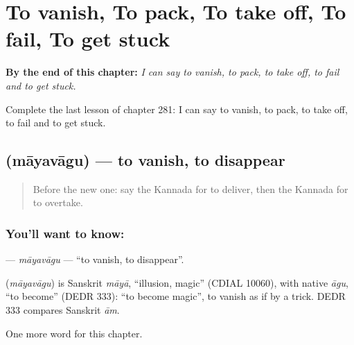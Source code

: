
\chapter{To vanish, To pack, To take off, To fail, To get stuck}
\label{ch:ka-to-vanish-to-pack-to-take-off-to-fail-to-get-stuck}

\begin{chapteropening}
\textbf{By the end of this chapter:} \emph{I can say to vanish, to pack, to take off, to fail and to get stuck.}

Complete the last lesson of chapter 281: I can say to vanish, to pack, to take off, to fail and to get stuck.
\end{chapteropening}

\section[\texorpdfstring{\kn{ಮಾಯವಾಗು} (māyavāgu)}{ಮಾಯವಾಗು (māyavāgu)}]{ (māyavāgu) — to vanish, to disappear}

\label{lesson:KA-C281-mayavagu}



\begin{quote}
Before the new one: say the Kannada for to deliver, then the Kannada for to overtake.
\end{quote}

\subsection*{You'll want to know: }
\textbf{} — \emph{māyavāgu} — \textquotedblleft{}to vanish, to disappear\textquotedblright{}.

\begin{cousinweb}
\textbf{} (\emph{māyavāgu}) is Sanskrit \emph{māyā}, \textquotedblleft{}illusion, magic\textquotedblright{} (CDIAL 10060), with native \emph{āgu}, \textquotedblleft{}to become\textquotedblright{} (DEDR 333): \textquotedblleft{}to become magic\textquotedblright{}, to vanish as if by a trick. DEDR 333 compares Sanskrit \emph{ām}.
\end{cousinweb}

\begin{grammarlens}[title={What you've built}]
One more word for this chapter.
\end{grammarlens}

